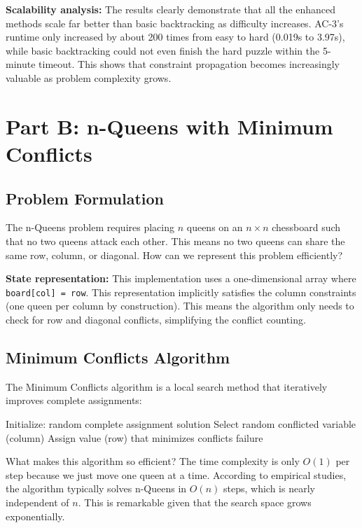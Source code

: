 \documentclass[letterpaper]{article}
\begin{document}
\textbf{Scalability analysis:} The results clearly demonstrate that all the enhanced methods scale far better than basic backtracking as difficulty increases. AC-3's runtime only increased by about 200 times from easy to hard (0.019s to 3.97s), while basic backtracking could not even finish the hard puzzle within the 5-minute timeout. This shows that constraint propagation becomes increasingly valuable as problem complexity grows.

\section{Part B: n-Queens with Minimum Conflicts}

\subsection{Problem Formulation}

The n-Queens problem requires placing $n$ queens on an $n \times n$ chessboard such that no two queens attack each other. This means no two queens can share the same row, column, or diagonal. How can we represent this problem efficiently?

\textbf{State representation:} This implementation uses a one-dimensional array where \texttt{board[col] = row}. This representation implicitly satisfies the column constraints (one queen per column by construction). This means the algorithm only needs to check for row and diagonal conflicts, simplifying the conflict counting.

\subsection{Minimum Conflicts Algorithm}

The Minimum Conflicts algorithm is a local search method that iteratively improves complete assignments:

\begin{algorithm}[h]
\caption{Minimum Conflicts for n-Queens}
\begin{algorithmic}[1]
\STATE Initialize: random complete assignment
\RETURN solution
\ENDIF
\STATE Select random conflicted variable (column)
\STATE Assign value (row) that minimizes conflicts
\ENDFOR
\RETURN failure
\end{algorithmic}
\end{algorithm}

What makes this algorithm so efficient? The time complexity is only $O(1)$ per step because we just move one queen at a time. According to empirical studies, the algorithm typically solves n-Queens in $O(n)$ steps, which is nearly independent of $n$. This is remarkable given that the search space grows exponentially.
\end{document}
